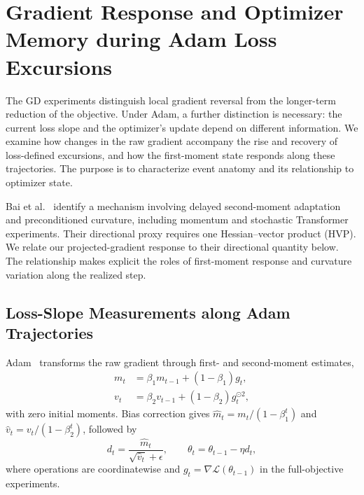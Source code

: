 \section{Gradient Response and Optimizer Memory during Adam Loss Excursions}
\label{sec:adam-diagnostics}

The GD experiments distinguish local gradient reversal from the longer-term
reduction of the objective. Under Adam, a further distinction is necessary:
the current loss slope and the optimizer's update depend on different
information. We examine how changes in the raw gradient accompany the rise
and recovery of loss-defined excursions, and how the first-moment state
responds along these trajectories. The purpose is to characterize event
anatomy and its relationship to optimizer state.

Bai et al.~\cite{bai2026adaptive} identify a mechanism involving delayed
second-moment adaptation and preconditioned curvature, including momentum
and stochastic Transformer experiments. Their directional proxy requires
one Hessian--vector product (HVP). We relate our
projected-gradient response to their directional quantity below. The
relationship makes explicit the roles of first-moment response and
curvature variation along the realized step.

\subsection{Loss-Slope Measurements along Adam Trajectories}

Adam~\cite{kingma2014adam} transforms the raw gradient through first-
and second-moment estimates,
\begin{equation}
\begin{aligned}
m_t&=\beta_1m_{t-1}+(1-\beta_1)g_t,\\
v_t&=\beta_2v_{t-1}+(1-\beta_2)g_t^{\odot2},
\end{aligned}
\label{eq:adam-moments}
\end{equation}
with zero initial moments. Bias correction gives
$\widehat m_t=m_t/(1-\beta_1^t)$ and
$\widehat v_t=v_t/(1-\beta_2^t)$, followed by
\begin{equation}
d_t=\frac{\widehat m_t}{\sqrt{\widehat v_t}+\epsilon},
\qquad \theta_t=\theta_{t-1}-\eta d_t,
\label{eq:adam-direction}
\end{equation}
where operations are coordinatewise and
$g_t=\nabla\mathcal L(\theta_{t-1})$ in the full-objective experiments.

